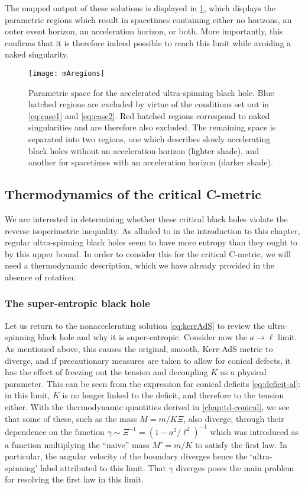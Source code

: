 \documentclass[
twoside,
openright,
frontopenright,
]{dmathesis}
\begin{document}
The mapped output of these solutions is displayed in \cref{fig:horroots}, which
displays the parametric regions which result in spacetimes containing either no
horizons, an outer event horizon, an acceleration horizon, or both. More
importantly, this confirms that it is therefore indeed possible to reach this
limit while avoiding a naked singularity.
 
\begin{figure}
  \centering
  \texttt{[image: mAregions]}
  \caption{\label{fig:horroots}Parametric space for the accelerated ultra-spinning
    black hole. Blue hatched regions are excluded by virtue of the conditions set
    out in \cref{eq:case1} and \cref{eq:case2}. Red hatched regions correspond to
    naked singularities and are therefore also excluded. The remaining space is
    separated into two regions, one which describes slowly accelerating black holes
    without an acceleration horizon (lighter shade), and another for spacetimes with
    an acceleration horizon (darker shade).}
\end{figure}

\subsection{Thermodynamics of the critical C-metric}

We are interested in determining whether these critical black holes violate the
reverse isoperimetric inequality.  As alluded to in the introduction to this chapter,
regular ultra-spinning black holes seem to have more entropy than they ought to
by this upper bound. In order to consider this for the critical C-metric, we
will need a thermodynamic description, which we have already provided in the
absence of rotation.

\subsubsection{The super-entropic black hole}
\label{sec:uskerr}

Let us return to the nonaccelerating solution \eqref{eq:kerrAdS} to review the
ultra-spinning black hole and why it is super-entropic. Consider now the
$a\to\ell$ limit. As mentioned above, this causes the original, smooth, Kerr-AdS
metric to diverge, and if precautionary measures are taken to allow for conical
defects, it has the effect of freezing out the tension and decoupling $K$ as a
physical parameter. This can be seen from the expression for conical deficits
\eqref{eq:deficit-al}: in this limit, $K$ is no longer linked to the deficit,
and therefore to the tension either. With the thermodynamic quantities derived
in \cref{chap:td-conical}, we see that some of these, such as the mass
$M=m/K \Xi$, also diverge, through their dependence on the function
$\gamma\sim \Xi^{-1} = (1-a^2/\ell^2)^{-1}$ which was introduced as a function
multiplying the ``naive'' mass $M' = m/K$ to satisfy the first law. In
particular, the angular velocity of the boundary diverges hence the
`ultra-spinning' label attributed to this limit. That $\gamma$ diverges poses
the main problem for resolving the first law in this limit.
\end{document}
